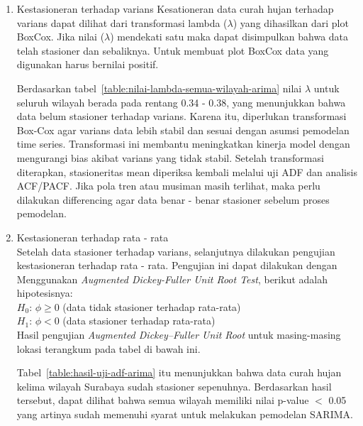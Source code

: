 \begin{enumerate}[label=\alph*.]
    \item Kestasioneran terhadap varians
    Kesationeran data curah hujan terhadap varians dapat dilihat dari transformasi lambda ($\lambda$) yang dihasilkan dari plot BoxCox.
    Jika nilai ($\lambda$) mendekati satu maka dapat disimpulkan bahwa data telah stasioner dan sebaliknya. Untuk membuat plot BoxCox data yang digunakan harus bernilai positif.
    
    Berdasarkan tabel~\ref{table:nilai-lambda-semua-wilayah-arima} nilai $\lambda$ untuk seluruh wilayah berada pada rentang 0.34 - 0.38, yang menunjukkan bahwa data belum stasioner terhadap varians.
    Karena itu, diperlukan transformasi Box-Cox agar varians data lebih stabil dan sesuai dengan asumsi pemodelan time series.
    Transformasi ini membantu meningkatkan kinerja model dengan mengurangi bias akibat varians yang tidak stabil.
    Setelah transformasi diterapkan, stasioneritas mean diperiksa kembali melalui uji ADF dan analisis ACF/PACF.
    Jika pola tren atau musiman masih terlihat, maka perlu dilakukan differencing agar data benar - benar stasioner sebelum proses pemodelan.

    \item Kestasioneran terhadap rata - rata \\
    Setelah data stasioner terhadap varians, selanjutnya dilakukan pengujian kestasioneran terhadap rata - rata.
    Pengujian ini dapat dilakukan dengan Menggunakan \textit{Augmented Dickey-Fuller Unit Root Test}, berikut adalah hipotesisnya: \\
    $H_0$: $\phi \ge 0$ (data tidak stasioner terhadap rata-rata) \\
    $H_1$: $\phi < 0$ (data stasioner terhadap rata-rata) \\
    Hasil pengujian \textit{Augmented Dickey--Fuller Unit Root} untuk masing-masing lokasi terangkum pada tabel di bawah ini.
    
    Tabel~\ref{table:hasil-uji-adf-arima} itu menunjukkan bahwa data curah hujan kelima wilayah Surabaya sudah stasioner sepenuhnya.
    Berdasarkan hasil tersebut, dapat dilihat bahwa semua wilayah memiliki nilai p-value $<$ 0.05 yang artinya sudah memenuhi syarat untuk melakukan pemodelan SARIMA.


\end{enumerate}
